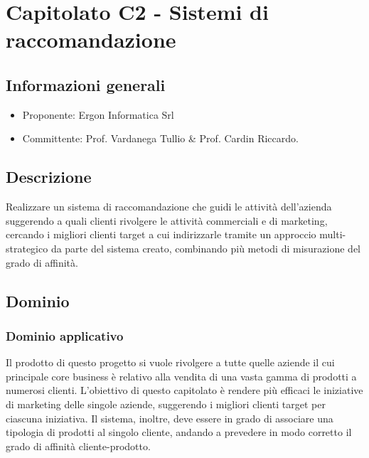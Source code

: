 \documentclass[12pt]{report}
\begin{document}
\chapter{Capitolato C2 - Sistemi di raccomandazione}\label{chapter:2}
\section{Informazioni generali}
\begin{itemize}
    \item Proponente: Ergon Informatica Srl
    \item Committente: Prof. Vardanega Tullio \& Prof. Cardin Riccardo.
\end{itemize}

\section{Descrizione}
Realizzare un sistema di raccomandazione che guidi le attività dell’azienda suggerendo a quali clienti rivolgere le attività commerciali e di marketing, cercando i migliori clienti target a cui indirizzarle tramite un approccio multi-strategico da parte del sistema creato, combinando più metodi di misurazione del grado di affinità.

\section{Dominio}
\subsection{Dominio applicativo}
Il prodotto di questo progetto si vuole rivolgere a tutte quelle aziende il cui principale core business è relativo alla vendita di una vasta gamma di prodotti a numerosi clienti. %
L'obiettivo di questo capitolato è rendere più efficaci le iniziative di marketing delle singole aziende, suggerendo i migliori clienti target per ciascuna iniziativa.
Il sistema, inoltre, deve essere in grado di associare una tipologia di prodotti al singolo cliente, andando a prevedere in modo corretto il grado di affinità cliente-prodotto.
\end{document}
